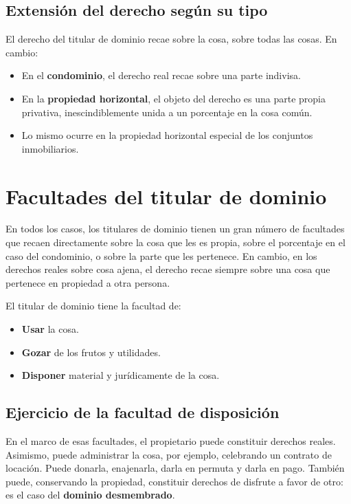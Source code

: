 \documentclass[12pt,oneside]{book}
\begin{document}
\subsection{Extensión del derecho según su tipo}

El derecho del titular de dominio recae sobre la cosa, sobre todas las cosas. En cambio:

\begin{itemize}
    \item En el \textbf{condominio}, el derecho real recae sobre una parte indivisa.
    \item En la \textbf{propiedad horizontal}, el objeto del derecho es una parte propia privativa, inescindiblemente unida a un porcentaje en la cosa común.
    \item Lo mismo ocurre en la propiedad horizontal especial de los conjuntos inmobiliarios.
\end{itemize}

\section{Facultades del titular de dominio}

En todos los casos, los titulares de dominio tienen un gran número de facultades que recaen directamente sobre la cosa que les es propia, sobre el porcentaje en el caso del condominio, o sobre la parte que les pertenece. En cambio, en los derechos reales sobre cosa ajena, el derecho recae siempre sobre una cosa que pertenece en propiedad a otra persona.

El titular de dominio tiene la facultad de:

\begin{itemize}
    \item \textbf{Usar} la cosa.
    \item \textbf{Gozar} de los frutos y utilidades.
    \item \textbf{Disponer} material y jurídicamente de la cosa.
\end{itemize}

\subsection{Ejercicio de la facultad de disposición}

En el marco de esas facultades, el propietario puede constituir derechos reales. Asimismo, puede administrar la cosa, por ejemplo, celebrando un contrato de locación. Puede donarla, enajenarla, darla en permuta y darla en pago. También puede, conservando la propiedad, constituir derechos de disfrute a favor de otro: es el caso del \textbf{dominio desmembrado}.
\end{document}
